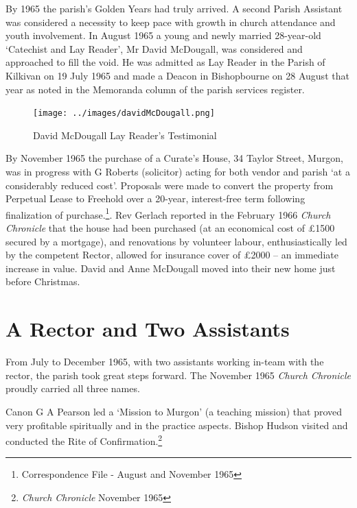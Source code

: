 By 1965 the parish's Golden Years had truly arrived. A second Parish Assistant was considered a necessity to keep pace with growth in church attendance and youth involvement. In August 1965 a young and newly married 28-year-old `Catechist and Lay Reader', Mr David McDougall, was considered and approached to fill the void. He was admitted as Lay Reader in the Parish of Kilkivan on 19 July 1965 and made a Deacon in Bishopbourne on 28 August that year as noted in the Memoranda column of the parish services register.









\begin{figure}[!htb]
\begin{center}
\texttt{[image: ../images/davidMcDougall.png]}
\caption{David McDougall Lay Reader's Testimonial}
\end{center}
\end{figure}




By November 1965 the purchase of a Curate's House, 34 Taylor Street, Murgon, was in progress with G Roberts (solicitor) acting for both vendor and parish `at a considerably reduced cost'. Proposals were made to convert the property from Perpetual Lease to Freehold over a 20-year, interest-free term following finalization of purchase.\footnote{Correspondence File - August and November 1965}. Rev Gerlach reported in the February 1966 \emph{Church Chronicle} that the house had been purchased (at an economical cost of \pounds1500 secured by a mortgage), and renovations by volunteer labour, enthusiastically led by the competent Rector, allowed for insurance cover of \pounds2000 -- an immediate increase in value. David and Anne McDougall moved into their new home just before Christmas.


\section{A Rector and Two Assistants}



From July to December 1965, with two assistants working in-team with the rector, the parish took great steps forward. The November 1965 \emph{Church Chronicle} proudly carried all three names.



Canon G A Pearson led a `Mission to Murgon' (a teaching mission) that proved very profitable spiritually and in the practice aspects. Bishop Hudson visited and conducted the Rite of Confirmation.\footnote{\emph{Church Chronicle} November 1965}


